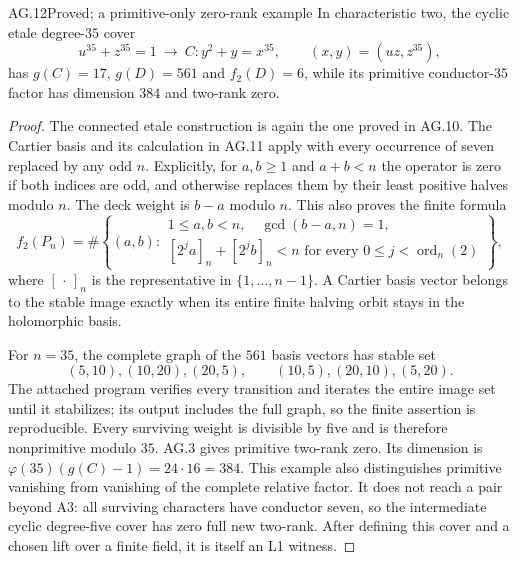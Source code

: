 \begin{claim}{AG.12}{Proved; a primitive-only zero-rank example}
In characteristic two, the cyclic etale degree-$35$ cover
\[
 u^{35}+z^{35}=1\ \longrightarrow\
       C:y^2+y=x^{35},\qquad (x,y)=(uz,z^{35}),
\]
has $g(C)=17$, $g(D)=561$ and $f_2(D)=6$, while its
primitive conductor-$35$ factor has dimension $384$ and
two-rank zero.
\end{claim}
\begin{proof}
The connected etale construction is again the one proved in
AG.10. The Cartier basis and its calculation in AG.11 apply
with every occurrence of seven replaced by any odd $n$.
Explicitly, for $a,b\ge1$ and $a+b<n$ the operator is zero
if both indices are odd, and otherwise replaces them by
their least positive halves modulo $n$. The deck weight
is $b-a$ modulo $n$. This also proves the finite formula
\[
 f_2(P_n)=\#\left\{(a,b):
 \begin{array}{l}
 1\le a,b<n,\quad \gcd(b-a,n)=1,\\
 {}[2^j a]_n+[2^j b]_n<n
       \text{ for every }0\le j<\operatorname{ord}_n(2)
 \end{array}\right\},
\]
where $[\,\cdot\,]_n$ is the representative in
$\{1,\ldots,n-1\}$. A Cartier basis vector belongs to the
stable image exactly when its entire finite halving orbit
stays in the holomorphic basis.

For $n=35$, the complete graph of the $561$ basis vectors
has stable set
\[
 (5,10),(10,20),(20,5),\qquad
 (10,5),(20,10),(5,20).
\]
The attached program verifies every transition and iterates
the entire image set until it stabilizes; its output includes
the full graph, so the finite assertion is reproducible.
Every surviving weight is divisible by five and is therefore
nonprimitive modulo $35$. AG.3 gives primitive two-rank
zero. Its dimension is
$\varphi(35)(g(C)-1)=24\cdot16=384$.
This example also distinguishes primitive vanishing from
vanishing of the complete relative factor. It does not reach
a pair beyond A3: all surviving characters have conductor
seven, so the intermediate cyclic degree-five cover has
zero full new two-rank. After defining this cover and a
chosen lift over a finite field, it is itself an L1 witness.
\end{proof}

